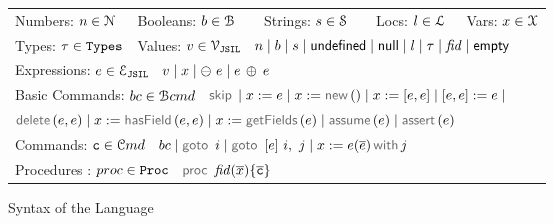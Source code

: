 \begin{figure}[!t]
\begin{minipage}{\textwidth}
\begin{tabular}{lllll}
	 Numbers: $n \in \mathcal{N}$ &  Booleans: $b \in \mathcal{B}$ & \  \ Strings: $s \in {\mathcal S}$ & \  \ Locs: $l \in {\mathcal L}$ & \  Vars: $x \in \mathcal{X}$ \\[0.1cm]
	Types: $\tau \in \mathtt{Types}$ & \multicolumn{4}{l}{Values: $v \in \mathcal{V}_{\mathtt{JSIL}}$  \ $n \mid b \mid s \mid  {{\sf undefined}} \mid {\sf null} \mid l \mid \tau \mid \mathit{fid} \mid {\sf empty}$} \\[0.1cm]
\multicolumn{5}{l}{Expressions: $e \in \mathcal{E}_{\mathtt{JSIL}}$  \ $v \mid x \mid \ominus\ e \mid e \, \oplus_{} \, e $} \\[0.1cm]
	\multicolumn{5}{l}{Basic Commands: $bc \in \mathcal{B}cmd$ \ $\jsilskip \mid \jvar := \jsilexpr  \mid \jvar := \jsilnew() \mid \jvar := [\jsilexpr, \jsilexpr] \mid [\jsilexpr, \jsilexpr] := \jsilexpr \mid$} \\[0.1cm]
	\multicolumn{5}{l}{\hspace{2.8cm} $\jsildelete(\jsilexpr, \jsilexpr) \mid \jvar := \hasfield(\jsilexpr, \jsilexpr) \mid \jvar := \getfields(\jsilexpr) \mid \assume(\jsilexpr) \mid \assert(\jsilexpr)$} \\[0.1cm]
	\multicolumn{5}{l}{Commands: $\mathtt{c} \in \mathcal{C}md$  \ $ \bcmd \mid \goto \ i \mid  \ifgoto{\jsilexpr}{i}{j} \mid \jsilcall{\jvar}{\jsilexpr}{\jvec{\jsilexpr}}{j}$} \\[0.1cm]
	\multicolumn{5}{l}{Procedures : $proc \in \mathtt{Proc}$  \ $\procedure{\fid}{\jvec{\jvar}}{\jvec{\ivlcmd}}$}
 \end{tabular}
 \vspace*{-0.2cm}
 \caption{Syntax of the \jsil Language}
 \label{def:jsil-types}
 \end{minipage}
  \vspace*{-0.5cm}
 \end{figure}
 


